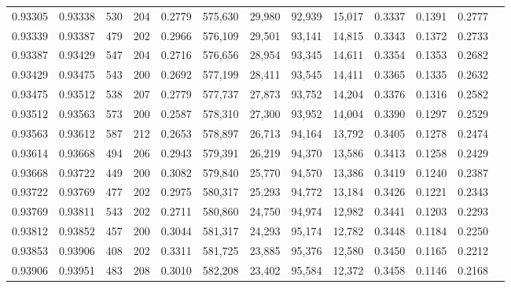 \begin{tabular}{rrrrrrrrrrrrr}
0.93305 & 0.93338 &   530 & 204 &                                     0.2779 & 575,630 &  29,980 &  92,939 &  15,017 & 0.3337 & 0.1391 & 0.2777 \\
0.93339 & 0.93387 &   479 & 202 &                                     0.2966 & 576,109 &  29,501 &  93,141 &  14,815 & 0.3343 & 0.1372 & 0.2733 \\
0.93387 & 0.93429 &   547 & 204 &                                     0.2716 & 576,656 &  28,954 &  93,345 &  14,611 & 0.3354 & 0.1353 & 0.2682 \\
0.93429 & 0.93475 &   543 & 200 &                                     0.2692 & 577,199 &  28,411 &  93,545 &  14,411 & 0.3365 & 0.1335 & 0.2632 \\
0.93475 & 0.93512 &   538 & 207 &                                     0.2779 & 577,737 &  27,873 &  93,752 &  14,204 & 0.3376 & 0.1316 & 0.2582 \\
0.93512 & 0.93563 &   573 & 200 &                                     0.2587 & 578,310 &  27,300 &  93,952 &  14,004 & 0.3390 & 0.1297 & 0.2529 \\
0.93563 & 0.93612 &   587 & 212 &                                     0.2653 & 578,897 &  26,713 &  94,164 &  13,792 & 0.3405 & 0.1278 & 0.2474 \\
0.93614 & 0.93668 &   494 & 206 &                                     0.2943 & 579,391 &  26,219 &  94,370 &  13,586 & 0.3413 & 0.1258 & 0.2429 \\
0.93668 & 0.93722 &   449 & 200 &                                     0.3082 & 579,840 &  25,770 &  94,570 &  13,386 & 0.3419 & 0.1240 & 0.2387 \\
0.93722 & 0.93769 &   477 & 202 &                                     0.2975 & 580,317 &  25,293 &  94,772 &  13,184 & 0.3426 & 0.1221 & 0.2343 \\
0.93769 & 0.93811 &   543 & 202 &                                     0.2711 & 580,860 &  24,750 &  94,974 &  12,982 & 0.3441 & 0.1203 & 0.2293 \\
0.93812 & 0.93852 &   457 & 200 &                                     0.3044 & 581,317 &  24,293 &  95,174 &  12,782 & 0.3448 & 0.1184 & 0.2250 \\
0.93853 & 0.93906 &   408 & 202 &                                     0.3311 & 581,725 &  23,885 &  95,376 &  12,580 & 0.3450 & 0.1165 & 0.2212 \\
0.93906 & 0.93951 &   483 & 208 &                                     0.3010 & 582,208 &  23,402 &  95,584 &  12,372 & 0.3458 & 0.1146 & 0.2168 \\

\end{tabular}
